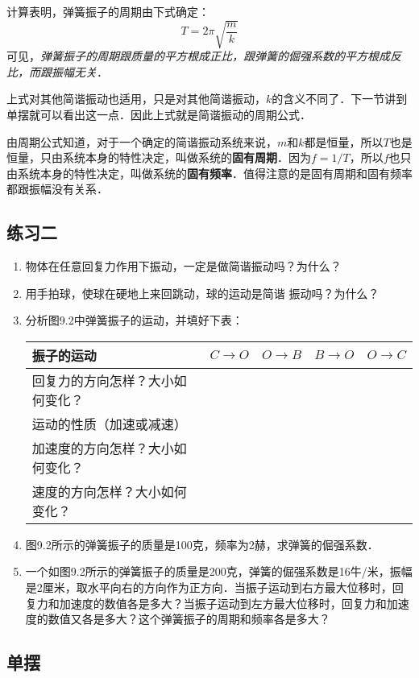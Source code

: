 计算表明，弹簧振子的周期由下式确定：
\[T=2\pi\sqrt{\frac{m}{k}} \]
可见，\textit{弹簧振子的周期跟质量的平方根成正比，跟弹簧的倔强系数的平方根成反比，而跟振幅无关}．

上式对其他简谐振动也适用，只是对其他简谐振动，$k$的含义不同了．下一节讲到单摆就可以看出这一点．因此上式就是简谐振动的周期公式．

由周期公式知道，对于一个确定的简谐振动系统来说，$m$和$k$都是恒量，所以$T$也是恒量，只由系统本身的特性决定，叫做系统的\textbf{固有周期}．因为$f=1/T$，所以$f$也只由系统本身的特性决定，叫做系统的\textbf{固有频率}．值得注意的是固有周期和固有频率都跟振幅没有关系．
	
\subsection*{练习二}

\begin{enumerate}
    \item 物体在任意回复力作用下振动，一定是做简谐振动吗？为什么？
    \item 用手拍球，使球在硬地上来回跳动，球的运动是简谐
    振动吗？为什么？
\item 分析图9.2中弹簧振子的运动，并填好下表：	
\begin{center}
    \begin{tabular}{p{}|c| c |c |c}
        \hline
        振子的运动  & $C\to O$ & $O\to B$ & $B\to O$ & $O\to C$\\
        \hline
        回复力的方向怎样？大小如何变化？&&&&\\
        运动的性质（加速或减速）&&&&\\
        加速度的方向怎样？大小如何变化？&&&&\\
        速度的方向怎样？大小如何变化？&&&&\\
        \hline
    \end{tabular}
\end{center}
	\item 图9.2所示的弹簧振子的质量是100克，频率为2赫，求弹簧的倔强系数．
    \item 一个如图9.2所示的弹簧振子的质量是200克，弹簧的倔强系数是16牛/米，振幅是2厘米，取水平向右的方向作为正方向．当振子运动到右方最大位移时，回复力和加速度的数值各是多大？当振子运动到左方最大位移时，回复力和加速度的数值又各是多大？这个弹簧振子的周期和频率各是多大？
\end{enumerate}


\subsection{单摆}

